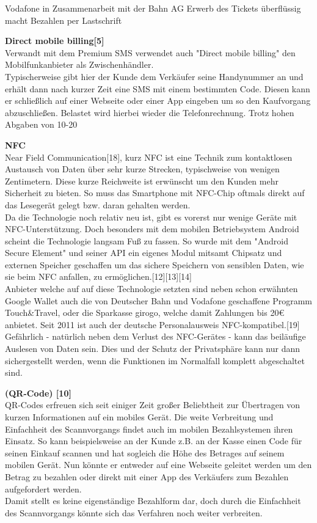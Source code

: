 				\subitem  Vodafone in Zusammenarbeit mit der Bahn AG
                \subitem  Erwerb des Tickets überflüssig macht
                \subitem  Bezahlen per Lastschrift


\textbf{Direct mobile billing[5]}\\
Verwandt mit dem Premium SMS verwendet auch "Direct mobile billing" den Mobilfunkanbieter als Zwischenhändler.\\
Typischerweise gibt hier der Kunde dem Verkäufer seine Handynummer an und erhält dann nach kurzer Zeit eine SMS mit einem bestimmten Code. Diesen kann er schließlich auf einer Webseite oder einer App eingeben um so den Kaufvorgang abzuschließen. Belastet wird hierbei wieder die Telefonrechnung.
Trotz hohen Abgaben von 10-20%


\textbf{NFC}\\
Near Field Communication[18], kurz NFC ist eine Technik zum kontaktlosen Austausch von Daten über sehr kurze Strecken, typischweise von wenigen Zentimetern. Diese kurze Reichweite ist erwünscht um den Kunden mehr Sicherheit zu bieten. So muss das Smartphone mit NFC-Chip oftmals direkt auf das Lesegerät gelegt bzw. daran gehalten werden. \\
Da die Technologie noch relativ neu ist, gibt es vorerst nur wenige Geräte mit NFC-Unterstützung. Doch besonders mit dem mobilen Betriebsystem Android scheint die Technologie langsam Fuß zu fassen. So wurde mit dem "Android Secure Element" und seiner API ein eigenes Modul mitsamt Chipsatz und externen Speicher geschaffen um das sichere Speichern von sensiblen Daten, wie sie beim NFC anfallen, zu ermöglichen.[12][13][14]\\
Anbieter welche auf auf diese Technologie setzten sind neben schon erwähnten Google Wallet auch die von Deutscher Bahn und Vodafone geschaffene Programm Touch&Travel, oder die Sparkasse girogo, welche damit Zahlungen bis 20€ anbietet.
Seit 2011 ist auch der deutsche Personalausweis NFC-kompatibel.[19]\\
Gefährlich - natürlich neben dem Verlust des NFC-Gerätes - kann das beiläufige Auslesen von Daten sein. Dies und der Schutz der Privatsphäre kann nur dann sichergestellt werden, wenn die Funktionen im Normalfall komplett abgeschaltet sind.

\textbf{ (QR-Code) [10]}\\
QR-Codes erfreuen sich seit einiger Zeit großer Beliebtheit zur Übertragen von kurzen Informationen auf ein mobiles Gerät. Die weite Verbreitung und Einfachheit des Scannvorgangs findet auch im mobilen Bezahlsystemen ihren Einsatz. So kann beispielsweise an der Kunde z.B. an der Kasse einen Code für seinen Einkauf scannen und hat sogleich die Höhe des Betrages auf seinem mobilen Gerät. Nun könnte er entweder auf eine Webseite geleitet werden um den Betrag zu bezahlen oder direkt mit einer App des Verkäufers zum Bezahlen aufgefordert werden.\\
Damit stellt es keine eigenständige Bezahlform dar, doch durch die Einfachheit des Scannvorgangs könnte sich das Verfahren noch weiter verbreiten. 


